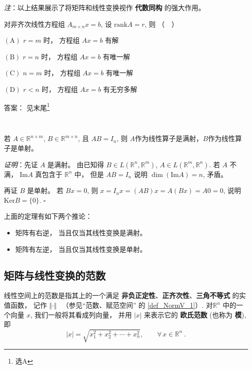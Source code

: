 \textsl{注}：以上结果展示了将矩阵和线性变换视作 \textbf{代数同构} 的强大作用。

\begin{exercise}{}
对非齐次线性方程组 $A_{m\times n}x=b$, 设 $\mathrm{rank}A=r$, 则 （$\quad$）

$(\mathrm{A})$ $r=m$ 时， 方程组 $Ax=b$ 有解

$(\mathrm{B})$ $r=n$ 时， 方程组 $Ax=b$ 有唯一解

$(\mathrm{C})$ $n=m$ 时， 方程组 $Ax=b$ 有唯一解

$(\mathrm{D})$ $r<n$ 时， 方程组 $Ax=b$ 有无穷多解

答案： 见末尾\footnote{选$\mathrm{A}$}
\end{exercise}
\verb| |

\begin{theorem}{}
若 $A\in\mathbb{R}^{n\times m}$, $B\in\mathbb{R}^{m\times n}$, 且 $AB=I_n$, 则 $A$作为线性算子是满射，$B$作为线性算子是单射。

\textsl{证明}：先证 $A$ 是满射。 由已知得 $B\in L(\mathbb{R}^{n},\mathbb{R}^{m})$, $A\in L(\mathbb{R}^{m},\mathbb{R}^{n})$.
若 $A$ 不满， $\mathrm{Im}A$ 真包含于 $\mathbb{R}^{n}$ 中， 但是 $AB=I_{n}$
说明 $\dim(\mathrm{Im}A)=n$, 矛盾。 

再证 $B$ 是单射。 若 $Bx=0$, 则 $x=I_{n}x=(AB)x=A(Bx)=A0=0$, 说明 $\mathrm{Ker}B=\{0\}$.
$\square$
\end{theorem}

上面的定理有如下两个推论：

\begin{itemize}
\item 矩阵有右逆， 当且仅当其线性变换是满射。 \end{itemize}

\begin{itemize}
\item 矩阵有左逆， 当且仅当其线性变换是单射。 
\end{itemize}




\subsection{矩阵与线性变换的范数}
线性空间上的范数是指其上的一个满足 \textbf{非负正定性}、\textbf{正齐次性}、\textbf{三角不等式} 的实值函数， 记作 $\left\Vert \cdot\right\Vert ~~$ 
（参见“范数、赋范空间” 的 \autoref{def_NormV_1}）. 对$\mathbb{R}^n$ 中的一个向量 $x$, 我们一般将其看成列向量， 并用 $|x|$ 来表示它的 \textbf{欧氏范数} (也称为 \textbf{模}), 即
$$ |x|=\sqrt{x_1^2+x^2_2+\cdots+x_n^2}, \qquad\forall \,x\in \mathbb{R}^n~.
$$

